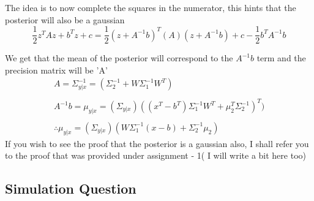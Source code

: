 The idea is to now complete the squares in the numerator, this hints that the posterior will also be a gaussian
\begin{equation}
    \frac{1}{2} z^T A z  + b^Tz + c = \frac{1}{2}(z + A^{-1}b)^T(A)(z + A^{-1}b) + c - \frac{1}{2}b^TA^{-1}b
\end{equation}

We get that the mean of the posterior will correspond to the $A^{-1}b $ term and the precision matrix  will be 'A'
\begin{gather*}
    \boxed{A    = \Sigma_{y|x}^{-1} = (\Sigma_2^{-1} + W \Sigma_1^{-1} W^T)}
    \\
    \\
    {A^{-1}b = \mu_{y|x} = (\Sigma_{y|x})((x^T - b^T)\Sigma_1^{-1} W^T + \mu_2^T \Sigma_2^{-1})^T)}
    \\
    \\
    \therefore \boxed{\mu_{y|x} = (\Sigma_{y|x})(W\Sigma_1^{-1}(x - b) + \Sigma_2^{-1} \mu_2)}
\end{gather*}
If you wish to see the proof that the posterior is a gaussian also, I shall refer you to the proof that was 
provided under assignment - 1( I will write a bit here too) \cite{CS3390}

\subsection{Simulation Question}


